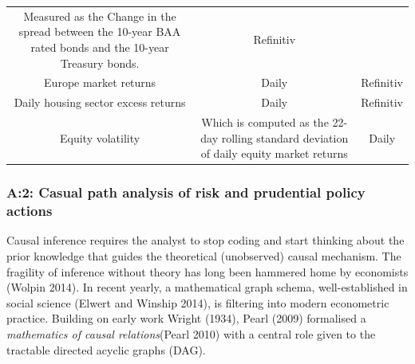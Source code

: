 \documentclass[
  10pt,
]{article}
\begin{document}
\begin{longtable}[]{@{}ccc@{}}
\begin{minipage}[t]{0.32\columnwidth}
Measured as the Change in the spread between the 10-year BAA rated bonds
and the 10-year Treasury bonds.\strut
\end{minipage} & \begin{minipage}[t]{0.24\columnwidth}\centering
Refinitiv\strut
\end{minipage}\tabularnewline
\begin{minipage}[t]{0.36\columnwidth}\centering
Europe market returns\strut
\end{minipage} & \begin{minipage}[t]{0.32\columnwidth}\centering
Daily\strut
\end{minipage} & \begin{minipage}[t]{0.24\columnwidth}\centering
Refinitiv\strut
\end{minipage}\tabularnewline
\begin{minipage}[t]{0.36\columnwidth}\centering
Daily housing sector excess returns\strut
\end{minipage} & \begin{minipage}[t]{0.32\columnwidth}\centering
Daily\strut
\end{minipage} & \begin{minipage}[t]{0.24\columnwidth}\centering
Refinitiv\strut
\end{minipage}\tabularnewline
\begin{minipage}[t]{0.36\columnwidth}\centering
Equity volatility\strut
\end{minipage} & \begin{minipage}[t]{0.32\columnwidth}\centering
Which is computed as the 22-day rolling standard deviation of daily
equity market returns\strut
\end{minipage} & \begin{minipage}[t]{0.24\columnwidth}\centering
Daily\strut
\end{minipage}\tabularnewline
\bottomrule
\end{longtable}

\hypertarget{a2-casual-path-analysis-of-risk-and-prudential-policy-actions}{%
\subsubsection{A:2: Casual path analysis of risk and prudential policy
actions}\label{a2-casual-path-analysis-of-risk-and-prudential-policy-actions}}

Causal inference requires the analyst to stop coding and start thinking
about the prior knowledge that guides the theoretical (unobserved)
causal mechanism. The fragility of inference without theory has long
been hammered home by economists (Wolpin 2014). In recent yearly, a
mathematical graph schema, well-established in social science (Elwert
and Winship 2014), is filtering into modern econometric practice.
Building on early work Wright (1934), Pearl (2009) formalised a
\emph{mathematics of causal relations}(Pearl 2010) with a central role
given to the tractable directed acyclic graphs (DAG).
\end{document}

